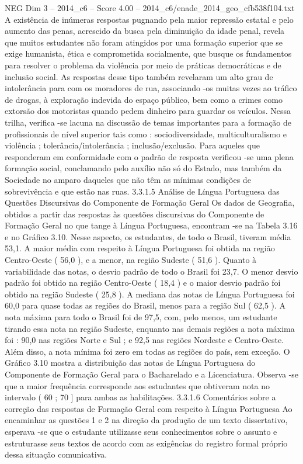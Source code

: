 \begin{textsample}{NEG Dim 3 – 2014\_c6 – Score 4.00 – 2014\_c6/enade\_2014\_geo\_cfb538f104.txt}
A existência de inúmeras respostas pugnando pela maior repressão estatal e pelo aumento das penas, acrescido da busca pela diminuição da idade penal, revela que muitos estudantes não foram atingidos por uma formação superior que se exige humanista, ética e comprometida socialmente, que busque os fundamentos para resolver o problema da violência por meio de práticas democráticas e de inclusão social.
As respostas desse tipo também revelaram um alto grau de intolerância para com os moradores de rua, associando -os muitas vezes ao tráfico de drogas, à exploração indevida do espaço público, bem como a crimes como extorsão dos motoristas quando pedem dinheiro para guardar os veículos.
Nessa trilha, verifica -se lacuna na discussão de temas importantes para a formação de profissionais de nível superior tais como : sociodiversidade, multiculturalismo e violência ; tolerância/intolerância ; inclusão/exclusão.
Para aqueles que responderam em conformidade com o padrão de resposta verificou -se uma plena formação social, conclamando pelo auxílio não só do Estado, mas também da Sociedade no amparo daqueles que não têm as mínimas condições de sobrevivência e que estão nas ruas. 3.3.1.5 Análise de Língua Portuguesa das Questões Discursivas do Componente de Formação Geral Os dados de Geografia, obtidos a partir das respostas às questões discursivas do Componente de Formação Geral no que tange à Língua Portuguesa, encontram -se na Tabela 3.16 e no Gráfico 3.10.
Nesse aspecto, os estudantes, de todo o Brasil, tiveram média 53,1.
A maior média com respeito à Língua Portuguesa foi obtida na região Centro-Oeste ( 56,0 ), e a menor, na região Sudeste ( 51,6 ).
Quanto à variabilidade das notas, o desvio padrão de todo o Brasil foi 23,7.
O menor desvio padrão foi obtido na região Centro-Oeste ( 18,4 ) e o maior desvio padrão foi obtido na região Sudeste ( 25,8 ).
A mediana das notas de Língua Portuguesa foi 60,0 para quase todas as regiões do Brasil, menos para a região Sul ( 62,5 ).
A nota máxima para todo o Brasil foi de 97,5, com, pelo menos, um estudante tirando essa nota na região Sudeste, enquanto nas demais regiões a nota máxima foi : 90,0 nas regiões Norte e Sul ; e 92,5 nas regiões Nordeste e Centro-Oeste.
Além disso, a nota mínima foi zero em todas as regiões do país, sem exceção.
O Gráfico 3.10 mostra a distribuição das notas de Língua Portuguesa do Componente de Formação Geral para o Bacharelado e a Licenciatura.
Observa -se que a maior frequência corresponde aos estudantes que obtiveram nota no intervalo ( 60 ; 70 ] para ambas as habilitações. 3.3.1.6 Comentários sobre a correção das respostas de Formação Geral com respeito à Língua Portuguesa Ao encaminhar as questões 1 e 2 na direção da produção de um texto dissertativo, esperava -se que o estudante utilizasse seus conhecimentos sobre o assunto e estruturasse seus textos de acordo com as exigências do registro formal próprio dessa situação comunicativa.

\end{textsample}
